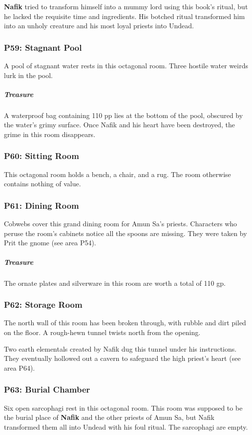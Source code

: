 \documentclass[10pt,a4paper,twoside,bg=print,twocolumn,openany,nodeprecatedcode]{dndbook}
\begin{document}
\textbf{Nafik} tried to transform himself into a mummy lord using this book's ritual, but he lacked the requisite time and ingredients. His botched ritual transformed him into an unholy creature and his most loyal priests into Undead.

\subsubsection{P59: Stagnant Pool}
A pool of stagnant water rests in this octagonal room. Three hostile water weirds lurk in the pool.

\subparagraph{Treasure}
A waterproof bag containing 110 pp lies at the bottom of the pool, obscured by the water's grimy surface. Once Nafik and his heart have been destroyed, the grime in this room disappears.

\subsubsection{P60: Sitting Room}
This octagonal room holds a bench, a chair, and a rug. The room otherwise contains nothing of value.

\subsubsection{P61: Dining Room}
Cobwebs cover this grand dining room for Amun Sa's priests. Characters who peruse the room's cabinets notice all the spoons are missing. They were taken by Prit the gnome (see area P54).

\subparagraph{Treasure}
The ornate plates and silverware in this room are worth a total of 110 gp.

\subsubsection{P62: Storage Room}
\begin{DndReadAloud}{}
The north wall of this room has been broken through, with rubble and dirt piled on the floor. A rough-hewn tunnel twists north from the opening.

\end{DndReadAloud}

Two earth elementals created by Nafik dug this tunnel under his instructions. They eventually hollowed out a cavern to safeguard the high priest's heart (see area P64).

\subsubsection{P63: Burial Chamber}
Six open sarcophagi rest in this octagonal room. This room was supposed to be the burial place of \textbf{Nafik} and the other priests of Amun Sa, but Nafik transformed them all into Undead with his foul ritual. The sarcophagi are empty.
\end{document}
